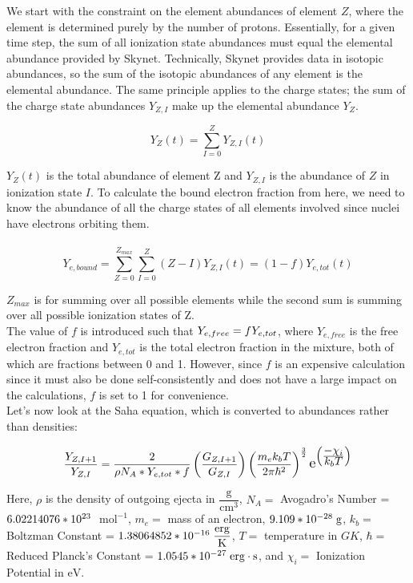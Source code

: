 \documentclass[11pt,a4paper]{article}
\begin{document}
We start with the constraint on the element abundances of element $Z$, where the element is determined purely by the number of protons. Essentially, for a given time step, the sum of all ionization state abundances must equal the elemental abundance provided by Skynet. Technically, Skynet provides data in isotopic abundances, so the sum of the isotopic abundances of any element is the elemental abundance. The same principle applies to the charge states; the sum of the charge state abundances $Y_{Z,I}$ make up the elemental abundance $Y_Z$.

$$Y_Z (t) = \sum_{I=0}^{Z} Y_{Z,I}(t)$$

$Y_Z (t)$ is the total abundance of element Z and $Y_{Z,I}$ is the abundance of $Z$ in ionization state $I$. To calculate the bound electron fraction from here, we need to know the abundance of all the charge states of all elements involved since nuclei have electrons orbiting them. 
\\\\
$$Y_{e,bound} = \sum_{Z=0}^{Z_{max}} \sum_{I=0}^{Z} (Z - I) Y_{Z,I}(t) = (1-f) Y_{e,tot}(t) $$

$Z_{max}$ is for summing over all possible elements while the second sum is summing over all possible ionization states of Z. 
\\The value of $f$ is introduced such that $Y_{e,free} = f \hspace{.1mm} Y_{e,tot}$, where $Y_{e,free}$ is the free electron fraction and $Y_{e,tot}$ is the total electron fraction in the mixture, both of which are fractions between 0 and 1. However, since $f$ is an expensive calculation since it must also be done self-consistently and does not have a large impact on the calculations, $f$ is set to 1 for convenience. \\

Let's now look at the Saha equation, which is converted to abundances rather than densities: 

\begin{align}
\frac{Y_{Z,I+1}}{Y_{Z,I}}  = \frac{2}{\rho N_A * Y_{e,tot}*f}  \left(\frac{G_{Z,I+1}}{G_{Z,I}}\right) \left(\frac{m_e k_b T}{2\pi\hbar^2}\right)^\frac{3}{2} \scalebox{1.3} e^{\left(\frac{\displaystyle -\chi_i}{\displaystyle k_b T}\right)}  
\end{align}

Here, $\rho $ is the density of outgoing ejecta in $\mathrm{\dfrac{g}{cm^3}}$, $N_A = $ Avogadro's Number = $6.02214076*10^{23} \hspace{.1 cm} $ $\mathrm{mol^{-1}}$,  $m_e = $ mass of an electron, $9.109 * 10^{-28} \hspace{.1 cm} \mathrm{g} $, $k_b = $ Boltzman Constant = $1.38064852 * 10^{-16} \hspace{.1 cm} \mathrm{\dfrac{erg}{K}}$, $T = $ temperature in $GK$, $\hbar = $ Reduced Planck's Constant = $1.0545 * 10^{-27} \hspace{.1cm} \mathrm{erg \cdot s}$, and $\chi_i = $ Ionization Potential in $\mathrm{eV}$.\\
 
\end{document}
